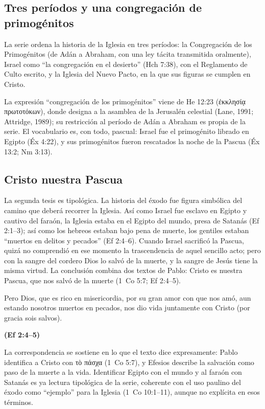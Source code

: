 \documentclass[11pt,letterpaper]{article}
\newcommand{\grc}[1]{\foreignlanguage{ancientgreek}{#1}}
\newcommand{\fuente}[1]{\par\hfill{\upshape\bfseries\small\textcolor{tierraroja}{#1}}}
\begin{document}
\subsection{Tres períodos y una congregación de primogénitos}
La serie ordena la historia de la Iglesia en tres períodos: la Congregación de los Primogénitos (de Adán a Abraham, con una ley tácita transmitida oralmente), Israel como ``la congregación en el desierto'' (Hch 7:38), con el Reglamento de Culto escrito, y la Iglesia del Nuevo Pacto, en la que sus figuras se cumplen en Cristo.

\begin{nota}[Precisión]
La expresión ``congregación de los primogénitos'' viene de He 12:23 (\grc{ἐκκλησίᾳ πρωτοτόκων}), donde designa a la asamblea de la Jerusalén celestial (Lane, 1991; Attridge, 1989); su restricción al período de Adán a Abraham es propia de la serie. El vocabulario es, con todo, pascual: Israel fue el primogénito librado en Egipto (Éx 4:22), y sus primogénitos fueron rescatados la noche de la Pascua (Éx 13:2; Nm 3:13).
\end{nota}

\subsection{Cristo nuestra Pascua}
La segunda tesis es tipológica. La historia del éxodo fue figura simbólica del camino que deberá recorrer la Iglesia. Así como Israel fue esclavo en Egipto y cautivo del faraón, la Iglesia estaba en el Egipto del mundo, presa de Satanás (Ef 2:1--3); así como los hebreos estaban bajo pena de muerte, los gentiles estaban ``muertos en delitos y pecados'' (Ef 2:4--6). Cuando Israel sacrificó la Pascua, quizá no comprendió en ese momento la trascendencia de aquel sencillo acto; pero con la sangre del cordero Dios lo salvó de la muerte, y la sangre de Jesús tiene la misma virtud. La conclusión combina dos textos de Pablo: Cristo es nuestra Pascua, que nos salvó de la muerte (1~Co 5:7; Ef 2:4--5).

\begin{cita}Pero Dios, que es rico en misericordia, por su gran amor con que nos amó, aun estando nosotros muertos en pecados, nos dio vida juntamente con Cristo (por gracia sois salvos).\fuente{(Ef 2:4--5)}\end{cita}

La correspondencia se sostiene en lo que el texto dice expresamente: Pablo identifica a Cristo con \grc{τὸ πάσχα} (1~Co 5:7), y Efesios describe la salvación como paso de la muerte a la vida. Identificar Egipto con el mundo y al faraón con Satanás es ya lectura tipológica de la serie, coherente con el uso paulino del éxodo como ``ejemplo'' para la Iglesia (1~Co 10:1--11), aunque no explícita en esos términos.
\end{document}
